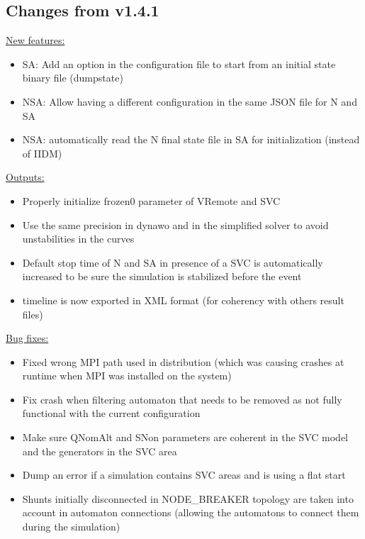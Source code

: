 \documentclass[a4paper, 12pt]{report}
\begin{document}
\subsection{Changes from v1.4.1}

\underline{New features:}

\begin{itemize}
\item SA: Add an option in the configuration file to start from an initial state binary file (dumpstate)
\item NSA: Allow having a different configuration in the same JSON file for N and SA
\item NSA: automatically read the N final state file in SA for initialization (instead of IIDM)
\end{itemize}

\underline{Outputs:}

\begin{itemize}
\item Properly initialize frozen0 parameter of VRemote and SVC
\item Use the same precision in dynawo and in the simplified solver to avoid unstabilities in the curves
\item Default stop time of N and SA in presence of a SVC is automatically increased to be sure the simulation is stabilized before the event
\item timeline is now exported in XML format (for coherency with others result files)
\end{itemize}

\underline{Bug fixes:}

\begin{itemize}
\item Fixed wrong MPI path used in distribution (which was causing crashes at runtime when MPI was installed on the system)
\item Fix crash when filtering automaton that needs to be removed as not fully functional with the current configuration
\item Make sure QNomAlt and SNon parameters are coherent in the SVC model and the generators in the SVC area
\item Dump an error if a simulation contains SVC areas and is using a flat start
\item Shunts initially disconnected in NODE\_BREAKER topology are taken into account in automaton connections (allowing the automatons to connect them during the simulation)
\end{itemize}
\end{document}
